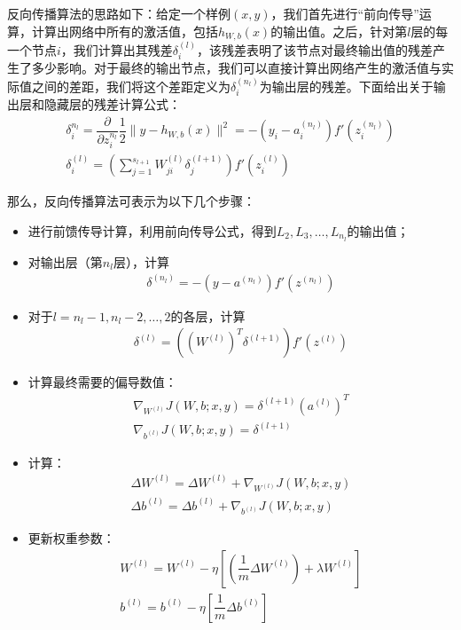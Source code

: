 \documentclass[supercite]{HustGraduPaper}
\begin{document}
\begin{sloppypar}
\begin{appendices}
    反向传播算法的思路如下：给定一个样例$(x,y)$，我们首先进行“前向传导”运算，计算出网络中所有的激活值，包括$h_{W,b}(x)$的输出值。之后，针对第$l$层的每一个节点$i$，我们计算出其残差$\delta^{(l)}_i$，该残差表明了该节点对最终输出值的残差产生了多少影响。对于最终的输出节点，我们可以直接计算出网络产生的激活值与实际值之间的差距，我们将这个差距定义为$\delta^{(n_l)}_i$为输出层的残差。下面给出关于输出层和隐藏层的残差计算公式：\begin{gather}
     \delta^{n_l}_i=\dfrac{\partial}{\partial z_i^{n_l}}\dfrac{1}{2}\lVert y-h_{W,b}(x)\rVert^2=-(y_i-a^{(n_l)}_i)f'(z^{(n_l)}_i)\\
     \delta^{(l)}_i=\left( \sum\limits^{s_{l+1}}_{j=1}W^{(l)}_{ji}\delta^{(l+1)}_j \right)f'(z^{(l)}_i)
    \end{gather}

    那么，反向传播算法可表示为以下几个步骤：\begin{itemize}
     \item 进行前馈传导计算，利用前向传导公式，得到$L_2,L_3,\dots,L_{n_l}$的输出值；
     \item 对输出层（第$n_l$层），计算\begin{gather}
       \delta^{(n_l)}=-(y-a^{(n_l)})f'(z^{(n_l)})
     \end{gather}
     \item  对于$l=n_l-1,n_l-2,\dots,2$的各层，计算\begin{gather}
      \delta^{(l)}=((W^{(l)})^T\delta^{(l+1)})f'(z^{(l)})
     \end{gather}
     \item  计算最终需要的偏导数值：\begin{gather}
        \nabla_{W^{(l)}}J(W,b;x,y)=\delta^{(l+1)}(a^{(l)})^T\\
        \nabla_{b^{(l)}}J(W,b;x,y)=\delta^{(l+1)}
     \end{gather}
     \item  计算：\begin{gather}
       \Delta W^{(l)}=\Delta W^{(l)}+\nabla_{W^{(l)}}J(W,b;x,y)\\
       \Delta b^{(l)}=\Delta b^{(l)}+\nabla_{b^{(l)}}J(W,b;x,y)
     \end{gather}
     \item  更新权重参数：\begin{gather}
       W^{(l)}=W^{(l)}-\eta\left[ \left( \dfrac{1}{m}\Delta W^{(l)} \right)+\lambda W^{(l)} \right]\\
       b^{(l)}=b^{(l)}-\eta\left[\dfrac{1}{m}\Delta b^{(l)} \right]
     \end{gather}
    \end{itemize}

\end{appendices}
\end{sloppypar}
\end{document}
